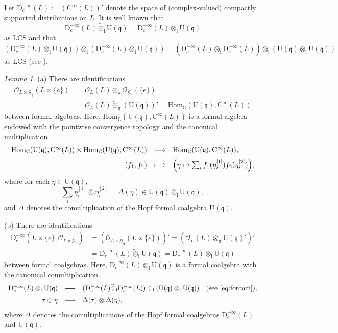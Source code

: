 \documentclass[12pt, a4paper]{amsart}
\newcommand{\BC}{{\mathbb {C}}}
\newcommand{\CG}{{\mathcal {G}}}
\newcommand{\CO}{{\mathcal {O}}}
\newcommand{\RC}{{\mathrm {C}}}
\newcommand{\RD}{{\mathrm {D}}}
\newcommand{\Ri}{{\mathrm{i}}}
\newcommand{\RU}{{\mathrm {U}}}
\newcommand{\Hom}{{\mathrm{Hom}}}
\newcommand{\wt}{\widetilde}
\newcommand{\q}{\mathfrak q}
\newcommand{\be}{\begin {equation}}
\newcommand{\ee}{\end {equation}}
\theoremstyle{Theorem}
\theoremstyle{Theorem}
\theoremstyle{Theorem}
\theoremstyle{Theorem}
\theoremstyle{Plain}
\theoremstyle{remark}
\theoremstyle{remark}
\theoremstyle{Definition}
\newtheorem{lemd}[dfn]{Lemma}
\numberwithin{equation}{section}
\begin{document}
Let $\RD^{-\infty}_c(L):=(\RC^{\infty}(L))'$ denote the space of (complex-valued) compactly supported distributions on $L$. 
It is well known that 
\[\RD^{-\infty}_c(L)\wt\otimes_{\mathrm{i}}\RU(\q)
      = \RD^{-\infty}_c(L)\otimes_{\mathrm{i}}\RU(\q)\] as LCS 
and that 
\be\label{eq:forcom}(\RD^{-\infty}_c(L)\otimes_{\mathrm{i}}\RU(\q))\wt\otimes_\Ri (\RD^{-\infty}_c(L)\otimes_{\mathrm{i}}\RU(\q))=(\RD^{-\infty}_c(L)\wt\otimes_{\mathrm{i}}\RD^{-\infty}_c(L))\otimes_{\mathrm{i}}(\RU(\q)\otimes_\Ri\RU(\q))\ee as LCS (see \cite[Example B.3]{CSW2}).

\begin{lemd}\label{lem:OLLqpro}
\noindent (a) There are identifications
\be\label{eq:OLLq1}
\begin{aligned}
\CO_{L\times \CG_{\q}}(L\times \{e\})
&=\CO_L(L)\wt\otimes_{\pi} \CO_{\CG_{\q}}(\{e\}) \\
&=\CO_L(L)\wt\otimes_{\pi} (\RU(\q))'
=\Hom_{\BC}(\RU(\q),\RC^{\infty}(L))
\end{aligned}
\ee
between formal algebras. Here, $\Hom_{\BC}(\RU(\q),\RC^{\infty}(L))$ is a formal algebra endowed with the pointwise convergence topology and the canonical multiplication
\[
\begin{array}{rcl}
\Hom_{\BC}(\RU(\q),\RC^{\infty}(L))\times \Hom_{\BC}(\RU(\q),\RC^{\infty}(L))
&\longrightarrow& \Hom_{\BC}(\RU(\q),\RC^{\infty}(L)), \\[2mm]
(f_1,f_2)&\longmapsto& \Bigl(\eta\mapsto \sum_i f_1(\eta_i^{[1]})f_2(\eta_i^{[2]})\Bigr),
\end{array}
\]
where for each $\eta\in \RU(\q)$,
\[
\sum_i\eta_i^{[1]}\otimes\eta_i^{[2]}=\Delta(\eta)\in \RU(\q)\otimes_\Ri\RU(\q),
\]
and $\Delta$ denotes the comultiplication of the Hopf formal coalgebra $\RU(\q)$.

\noindent (b) There are identifications
\be \label{eq:DtoDotimes}
\begin{aligned}
\RD^{-\infty}_c(L\times\{e\};\CO_{L\times \CG_{\q}})
&= (\CO_{L\times \CG_{\q}}(L\times \{e\}))'
= (\CO_L(L)\wt\otimes_{\pi} \RU(\q)')' \\
&= \RD^{-\infty}_c(L)\wt\otimes_{\mathrm{i}}\RU(\q)
= \RD^{-\infty}_c(L)\otimes_{\mathrm{i}}\RU(\q)
\end{aligned}
\ee
between formal coalgebras. Here, $\RD^{-\infty}_c(L)\otimes_{\mathrm{i}}\RU(\q)$ is a formal coalgebra with the canonical comultiplication
\[
\begin{array}{rcl}
\RD^{-\infty}_c(L)\otimes_{\mathrm{i}}\RU(\q)
&\longrightarrow&
(\RD^{-\infty}_c(L)\wt\otimes_{\mathrm{i}}\RD^{-\infty}_c(L))\otimes_{\mathrm{i}}(\RU(\q)\otimes_\Ri\RU(\q))
\quad\text{(see \eqref{eq:forcom})}, \\[2mm]
\tau\otimes\eta&\longmapsto& \Delta(\tau)\otimes\Delta(\eta),
\end{array}
\]
where $\Delta$ denotes the comultiplications of the Hopf formal coalgebras $\RD^{-\infty}_c(L)$ and $\RU(\q)$.
\end{lemd}
\end{document}
